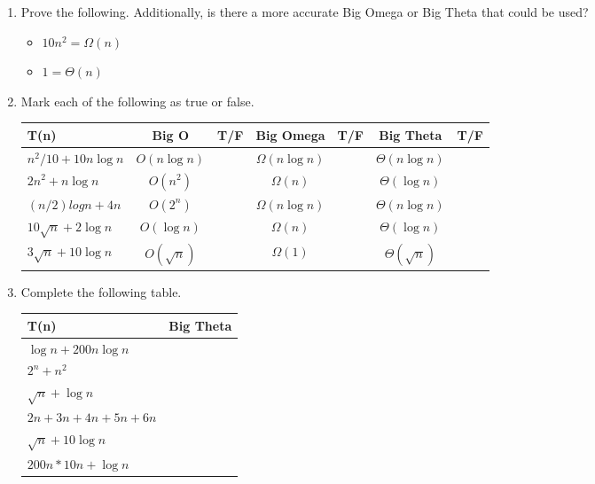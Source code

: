 \documentclass[11pt]{article}
\begin{document}
\begin{enumerate}[leftmargin=*]

\item Prove the following. Additionally, is there a more accurate Big Omega or Big Theta that could be used?
\begin{itemize}
    \item $10n^2 = \Omega(n)$
    \item $1 = \Theta(n)$
\end{itemize}

\item Mark each of the following as true or false.
    \begin{center}
        \begin{tabular}{l | c | c | c | c | c | c}
            T(n) & Big O & T/F & Big Omega & T/F & Big Theta & T/F \\ \hline
            $ n^2/10 + 10 n \log n$ & $O(n \log n)$ & & $\Omega(n \log n)$ & & $\Theta(n \log n)$ & \\ \hline
            $ 2n^2 + n \log n$ & $O(n^2)$ & & $\Omega(n)$ & & $\Theta(\log n)$ & \\ \hline
            $(n/2) log n + 4n$ & $O(2^n)$ & & $\Omega(n \log n)$ & & $\Theta(n \log n)$ & \\ \hline
            $10 \sqrt{n} + 2\log n$ & $O(\log n)$ & & $\Omega(n)$ & & $\Theta(\log n)$ & \\ \hline
            $3\sqrt{n} + 10 \log n$ & $O(\sqrt n)$ & & $\Omega(1)$ & & $\Theta(\sqrt n)$ & \\ \hline
        \end{tabular}
    \end{center}
    \item Complete the following table.
    \begin{center}
        \begin{tabular}{l | c }
            T(n) & Big Theta \\ \hline
            $\log n + 200 n \log n$ & \\ \hline
            $2^n + n^2$ & \\ \hline
            $\sqrt n + \log n$ & \\ \hline
            $2n + 3n + 4n + 5n + 6n$ & \\ \hline
            $\sqrt{n} + 10 \log n$ & \\ \hline
            $200 n * 10 n + \log n$ & \\ \hline
        \end{tabular}
    \end{center}
    

\end{enumerate}
\end{document}
